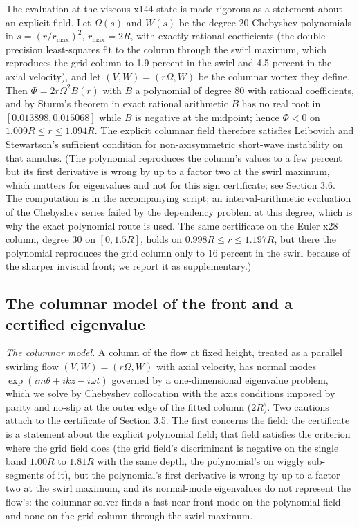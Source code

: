 \documentclass[11pt]{article}
\begin{document}
The evaluation at the viscous x144 state is made rigorous as a statement about an explicit field. Let $\Omega(s)$ and $W(s)$ be the degree-20 Chebyshev polynomials in $s = (r / r_{\max})^2$, $r_{\max} = 2R$, with exactly rational coefficients (the double-precision least-squares fit to the column through the swirl maximum, which reproduces the grid column to 1.9 percent in the swirl and 4.5 percent in the axial velocity), and let $(V, W) = (r \Omega, W)$ be the columnar vortex they define. Then $\Phi = 2 r \Omega^2 B(r)$ with $B$ a polynomial of degree 80 with rational coefficients, and by Sturm's theorem in exact rational arithmetic $B$ has no real root in $[0.013898, 0.015068]$ while $B$ is negative at the midpoint; hence $\Phi < 0$ on $1.009 R \le r \le 1.094 R$. The explicit columnar field therefore satisfies Leibovich and Stewartson's sufficient condition \cite{LS83} for non-axisymmetric short-wave instability on that annulus. (The polynomial reproduces the column's values to a few percent but its first derivative is wrong by up to a factor two at the swirl maximum, which matters for eigenvalues and not for this sign certificate; see Section 3.6. The computation is in the accompanying script; an interval-arithmetic evaluation of the Chebyshev series failed by the dependency problem at this degree, which is why the exact polynomial route is used. The same certificate on the Euler x28 column, degree 30 on $[0, 1.5 R]$, holds on $0.998 R \le r \le 1.197 R$, but there the polynomial reproduces the grid column only to 16 percent in the swirl because of the sharper inviscid front; we report it as supplementary.)

\subsection{The columnar model of the front and a certified eigenvalue}

\emph{The columnar model.} A column of the flow at fixed height, treated as a parallel swirling flow $(V, W) = (r \Omega, W)$ with axial velocity, has normal modes $\exp(i m \theta + i k z - i \omega t)$ governed by a one-dimensional eigenvalue problem, which we solve by Chebyshev collocation with the axis conditions imposed by parity and no-slip at the outer edge of the fitted column ($2 R$). Two cautions attach to the certificate of Section 3.5. The first concerns the field: the certificate is a statement about the explicit polynomial field; that field satisfies the criterion where the grid field does (the grid field's discriminant is negative on the single band $1.00 R$ to $1.81 R$ with the same depth, the polynomial's on wiggly sub-segments of it), but the polynomial's first derivative is wrong by up to a factor two at the swirl maximum, and its normal-mode eigenvalues do not represent the flow's: the columnar solver finds a fast near-front mode on the polynomial field and none on the grid column through the swirl maximum.
\end{document}
